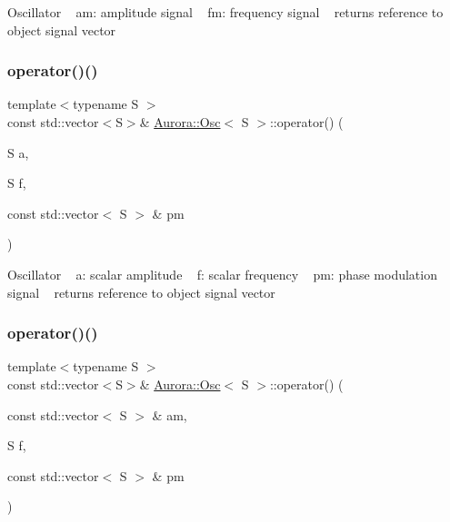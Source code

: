 Oscillator ~\newline
am\+: amplitude signal ~\newline
fm\+: frequency signal ~\newline
returns reference to object signal vector \mbox{\label{class_aurora_1_1_osc_a21019c4df8f4cf26af9fc50ac0c9f336}} 
\subsubsection{\texorpdfstring{operator()()}{operator()()}\hspace{0.1cm}{\footnotesize\ttfamily [5/6]}}
{\footnotesize\ttfamily template$<$typename S $>$ \\
const std\+::vector$<$S$>$\& \hyperlink{class_aurora_1_1_osc}{Aurora\+::\+Osc}$<$ S $>$\+::operator() (\begin{DoxyParamCaption}\item[{S}]{a,  }\item[{S}]{f,  }\item[{const std\+::vector$<$ S $>$ \&}]{pm }\end{DoxyParamCaption})\hspace{0.3cm}{\ttfamily [inline]}}

Oscillator ~\newline
 a\+: scalar amplitude ~\newline
f\+: scalar frequency ~\newline
pm\+: phase modulation signal ~\newline
returns reference to object signal vector \mbox{\label{class_aurora_1_1_osc_a6a8967d1e19757d77521e5b64842f7e3}} 
\subsubsection{\texorpdfstring{operator()()}{operator()()}\hspace{0.1cm}{\footnotesize\ttfamily [6/6]}}
{\footnotesize\ttfamily template$<$typename S $>$ \\
const std\+::vector$<$S$>$\& \hyperlink{class_aurora_1_1_osc}{Aurora\+::\+Osc}$<$ S $>$\+::operator() (\begin{DoxyParamCaption}\item[{const std\+::vector$<$ S $>$ \&}]{am,  }\item[{S}]{f,  }\item[{const std\+::vector$<$ S $>$ \&}]{pm }\end{DoxyParamCaption})\hspace{0.3cm}{\ttfamily [inline]}}

